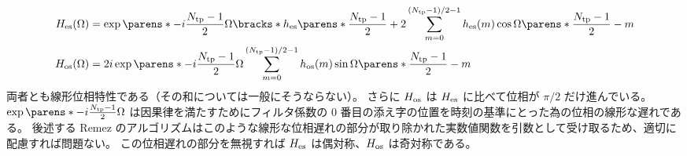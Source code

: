                 \begin{align*}
                    \Hes(\Omega) &= \exp\parens*{-i\frac{\Ntp-1}{2}\Omega}\bracks*{\hes\parens*{\frac{\Ntp-1}{2}} + 2\sum_{m=0}^{(\Ntp-1)/2-1}{\hes(m)\cos\Omega\parens*{\frac{\Ntp-1}{2}-m}}} \\
                    \Hos(\Omega) &= 2i\exp\parens*{-i\frac{\Ntp-1}{2}\Omega}\sum_{m=0}^{(\Ntp-1)/2-1}{\hos(m)\sin\Omega\parens*{\frac{\Ntp-1}{2}-m}}
                \end{align*}
                両者とも線形位相特性である（その和については一般にそうならない）。
                さらに $H_{\text{os}}$ は $H_{\text{es}}$ に比べて位相が $\pi/2$ だけ進んでいる。
                $\exp\parens*{-i\frac{\Ntp-1}{2}\Omega}$ は因果律を満たすためにフィルタ係数の 0 番目の添え字の位置を時刻の基準にとった為の位相の線形な遅れである。
                後述する Remez のアルゴリズムはこのような線形な位相遅れの部分が取り除かれた実数値関数を引数として受け取るため、適切に配慮すれば問題ない。
                この位相遅れの部分を無視すれば $H_{\text{es}}$ は偶対称、$H_{\text{os}}$ は奇対称である。
